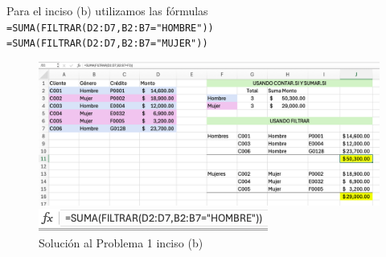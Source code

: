 \documentclass{article}
\begin{document}
\noindent
Para el inciso (b) utilizamos las fórmulas
\\[12pt]
\texttt{=SUMA(FILTRAR(D2:D7,B2:B7="HOMBRE"))}
\\[0pt]
\texttt{=SUMA(FILTRAR(D2:D7,B2:B7="MUJER"))}
\begin{figure}[!h]
    \centering
    \begin{minipage}{\textwidth}
        \centering
        \includegraphics[width=\textwidth]{figures/s101-1b1.png}
    \end{minipage}
    \hfill
    \begin{minipage}{\textwidth}
        \centering
        \includegraphics[width=\textwidth]{figures/s101-1b2.png}
    \end{minipage}
    \captionsetup{width=0.9\textwidth}
    \caption{Solución al Problema 1 inciso (b)}
    \label{fig:s101-1b}
\end{figure}
\end{document}
